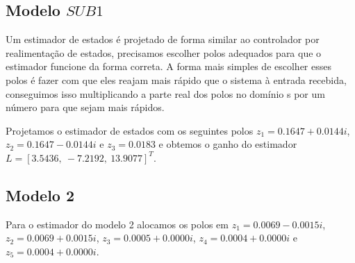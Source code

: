 \subsection{Modelo $SUB1$}
Um estimador de estados é projetado de forma similar ao controlador por realimentação de estados, precisamos escolher polos adequados para que o estimador funcione da forma correta. A forma mais simples de escolher esses polos é fazer com que eles reajam mais rápido que o sistema à entrada recebida, conseguimos isso multiplicando a parte real dos polos no domínio s por um número para que sejam mais rápidos. 


Projetamos o estimador de estados com os seguintes polos $z_1=0.1647 + 0.0144i$, $z_2=0.1647 - 0.0144i$ e $z_3=0.0183$ e obtemos o ganho do estimador $L=[3.5436,~-7.2192,~13.9077]^T$. 

\subsection{Modelo 2}
Para o estimador do modelo 2 alocamos os polos em $z_1=0.0069 - 0.0015i$, $z_2=0.0069 + 0.0015i$, $z_3=0.0005 + 0.0000i$, $z_4=0.0004 + 0.0000i$ e $z_5=0.0004 + 0.0000i$.





















